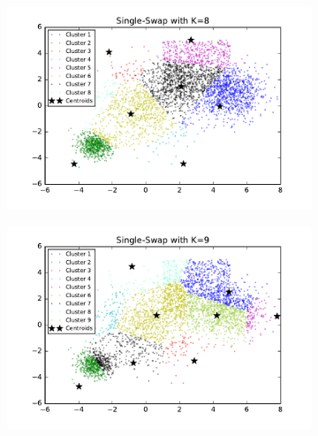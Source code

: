 \begin{description}
\begin{description}
\begin{figure}[!h]
\begin{subfigure}[b]{0.475\textwidth}
        \end{subfigure}
        \hfill
        \begin{subfigure}[b]{0.475\textwidth}  
            \centering 
            \includegraphics[width=\textwidth]{./figures/bigClustering_singleSwap_8.pdf}
        \end{subfigure}
        \begin{subfigure}[b]{0.475\textwidth}   
            \centering 
            \includegraphics[width=\textwidth]{./figures/bigClustering_singleSwap_9.pdf}
        \end{subfigure}
        \hfill
        \begin{subfigure}[b]{0.475\textwidth}   
            \centering 

\end{subfigure}
\end{figure}
\end{description}
\end{description}
